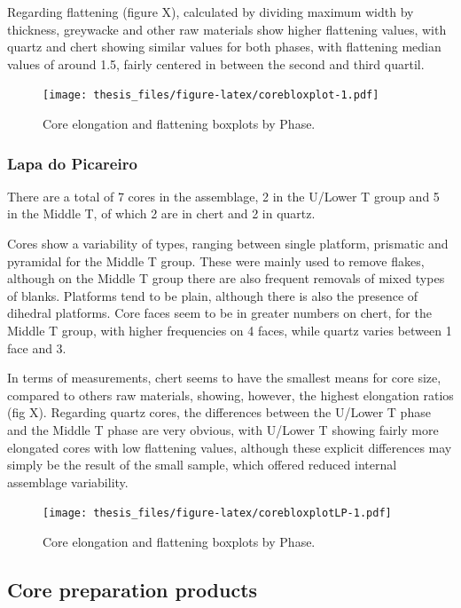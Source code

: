 \documentclass[12pt,twoside]{reedthesis}
\begin{document}
Regarding flattening (figure X), calculated by dividing maximum width by thickness, greywacke and other raw materials show higher flattening values, with quartz and chert showing similar values for both phases, with flattening median values of around 1.5, fairly centered in between the second and third quartil.
\begin{figure}
\centering
\texttt{[image: thesis\_files/figure-latex/corebloxplot-1.pdf]}
\caption{\label{fig:corebloxplot}Core elongation and flattening boxplots by Phase.}
\end{figure}
\hypertarget{lapa-do-picareiro-4}{%
\subsubsection{Lapa do Picareiro}\label{lapa-do-picareiro-4}}

There are a total of 7 cores in the assemblage, 2 in the U/Lower T group and 5 in the Middle T, of which 2 are in chert and 2 in quartz.

Cores show a variability of types, ranging between single platform, prismatic and pyramidal for the Middle T group. These were mainly used to remove flakes, although on the Middle T group there are also frequent removals of mixed types of blanks. Platforms tend to be plain, although there is also the presence of dihedral platforms. Core faces seem to be in greater numbers on chert, for the Middle T group, with higher frequencies on 4 faces, while quartz varies between 1 face and 3.

In terms of measurements, chert seems to have the smallest means for core size, compared to others raw materials, showing, however, the highest elongation ratios (fig X). Regarding quartz cores, the differences between the U/Lower T phase and the Middle T phase are very obvious, with U/Lower T showing fairly more elongated cores with low flattening values, although these explicit differences may simply be the result of the small sample, which offered reduced internal assemblage variability.
\begin{figure}
\centering
\texttt{[image: thesis\_files/figure-latex/corebloxplotLP-1.pdf]}
\caption{\label{fig:corebloxplotLP}Core elongation and flattening boxplots by Phase.}
\end{figure}
\hypertarget{core-preparation-products}{%
\subsection{Core preparation products}\label{core-preparation-products}}
\end{document}
